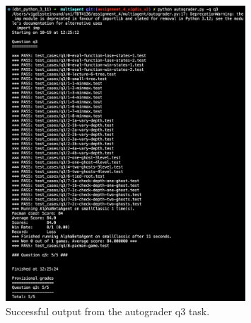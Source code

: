 \documentclass{article}
\begin{document}
    \begin{figure}[H]
        \centering
        \includegraphics[width=0.8\textwidth]{Images/test_q3.png}
        \caption[Q3 test output]{Successful output from the autograder q3 task.}
        \label{fig:Q3 test output}
    \end{figure}

\end{document}
